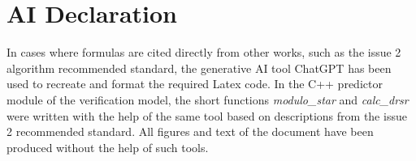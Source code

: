 \chapter*{AI Declaration}

In cases where formulas are cited directly from other works, such as the issue 2 algorithm recommended standard, the generative AI tool ChatGPT has been used to recreate and format the required Latex code. In the C++ predictor module of the verification model, the short functions \textit{modulo\_star} and \textit{calc\_drsr} were written with the help of the same tool based on descriptions from the issue 2 recommended standard. All figures and text of the document have been produced without the help of such tools.

